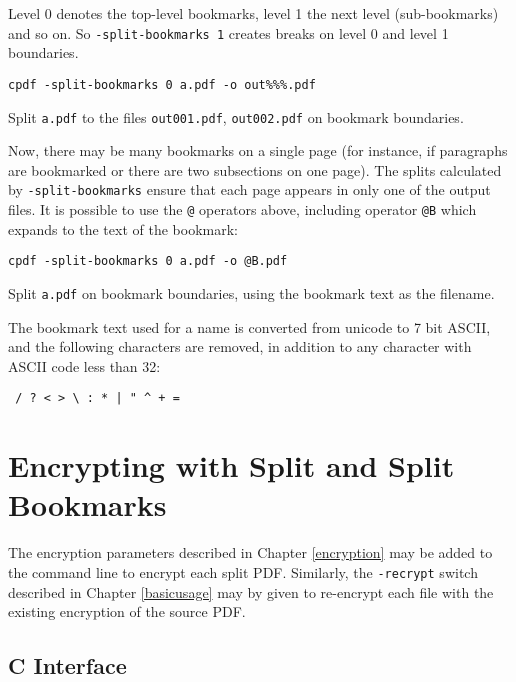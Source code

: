 \documentclass{book}
\begin{document}
Level 0 denotes the top-level bookmarks, level 1 the next level (sub-bookmarks)
and so on. So \texttt{-split-bookmarks 1} creates breaks on level 0 and level
1 boundaries.

  \begin{framed}\small
    \verb!cpdf -split-bookmarks 0 a.pdf -o out%%%.pdf!

    \vspace{2.5mm}
    \noindent Split \texttt{a.pdf} to the files \texttt{out001.pdf},
\texttt{out002.pdf} on bookmark boundaries.

  \end{framed}
\noindent Now, there may be many bookmarks on a single page (for instance, if
paragraphs are bookmarked or there are two subsections on one page). The splits
calculated by \texttt{-split-bookmarks} ensure that each page appears in only
one of the output files.
  It is possible to use the \texttt{@} operators above, including operator \texttt{@B} which expands to the text of the bookmark:

  \begin{framed}\small
    \verb!cpdf -split-bookmarks 0 a.pdf -o @B.pdf!

    \vspace{2.5mm}
    \noindent Split \texttt{a.pdf} on bookmark boundaries, using the bookmark text as the filename.

  \end{framed}
\noindent The bookmark text used for a name is converted from unicode to 7 bit ASCII, and the following characters are removed, in addition to any character with ASCII code less than 32:
  \begin{framed}
  \centering
  \verb! / ? < > \ : * | " ^ + =!
  \end{framed}

\section{Encrypting with Split and Split Bookmarks}
The encryption parameters described in Chapter \ref{encryption} may be added to the command line to encrypt each split PDF. Similarly, the \texttt{-recrypt} switch described in Chapter \ref{basicusage} may by given to re-encrypt each file with the existing encryption of the source PDF. 
\pagestyle{empty}\thispagestyle{fancy}

\begin{cpdflib}
\clearpage
\section*{C Interface}
\begin{small}\tt

\end{small}
\end{cpdflib}
\end{document}
